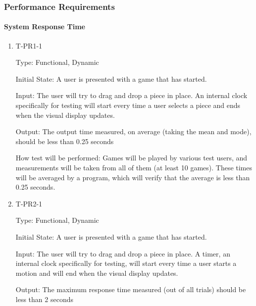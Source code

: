 \documentclass[12pt, titlepage]{article}
\begin{document}
\subsubsection{Performance Requirements}

    \paragraph{System Response Time}

        \begin{enumerate}
    
            \item{T-PR1-1\\}
            
                Type: Functional, Dynamic
                					
                Initial State: A user is presented with a game that has started.
                					
                Input: The user will try to drag and drop a piece in place. An
                internal clock specifically for testing will start every time a user selects a piece and ends when the visual display updates.
                					
                Output: The output time measured, on average (taking the mean and mode), should be less than 0.25 seconds
                					
                How test will be performed: Games will be played by various test users, and measurements will be taken from all of them (at least 10 games). These times will be averaged by a program, which will verify that the average is less than 0.25 seconds.
            
            \item{T-PR2-1\\}
            
                Type: Functional, Dynamic
                					
                Initial State: A user is presented with a game that has started.
                					
                Input: The user will try to drag and drop a piece in place. A timer, an
                internal clock specifically for testing, will start every time a user starts a motion and will end when the visual display updates.
                					
                Output: The maximum response time measured (out of all trials) should be less than 2 seconds
                					

\end{enumerate}
\end{document}
